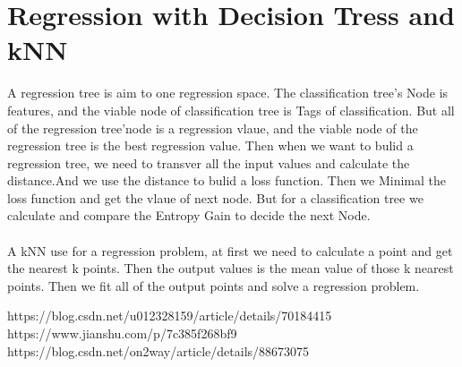 \documentclass{article}
\begin{document}
\section{Regression with Decision Tress and kNN}
A regression tree is aim to one regression space. The classification tree's Node is features, and the viable node of classification tree is Tags of classification.
But all of the regression tree'node is a regression vlaue, and the viable node of the regression tree is the best regression value.
Then when we want to bulid a regression tree, we need to transver all the input values and calculate the distance.And we use the distance to bulid a loss function.
Then we Minimal the loss function and get the vlaue of next node. But for a classification tree we calculate and compare the Entropy Gain to decide the next Node.
\\
\\
A kNN use for a regression problem, at first we need to calculate a point and get the nearest k points. Then the output values is the mean value of those k nearest points.
Then we fit all of the output points and solve a regression problem.

\begin{thebibliography}{99}  
     https://blog.csdn.net/u012328159/article/details/70184415  
     https://www.jianshu.com/p/7c385f268bf9
     https://blog.csdn.net/on2way/article/details/88673075
\end{thebibliography}
\end{document}
